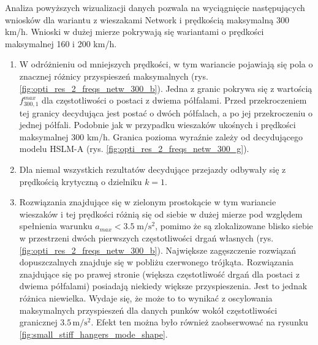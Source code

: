 Analiza powyższych wizualizacji danych pozwala na wyciągnięcie następujących wniosków dla wariantu z wieszakami Network i prędkością maksymalną 300 km/h. Wnioski w dużej mierze pokrywają się wariantami o prędkości maksymalnej 160 i 200 km/h.
\begin{enumerate}
	\item W odróżnieniu od mniejszych prędkości, w tym wariancie pojawiają się pola o znacznej różnicy przyspieszeń maksymalnych (rys. \ref{fig:opti_res_2_freqs_netw_300_b}). Jedna z granic pokrywa się z wartością $f_{300,1}^{max}$ dla częstotliwości o postaci z dwiema półfalami. Przed przekroczeniem tej granicy decydująca jest postać o dwóch półfalach, a po jej przekroczeniu o jednej półfali. Podobnie jak w przypadku wieszaków ukośnych i prędkości maksymalnej 300 km/h. Granica pozioma wyraźnie zależy od decydującego modelu HSLM-A (rys. \ref{fig:opti_res_2_freqs_netw_300_g}).
	\item Dla niemal wszystkich rezultatów decydujące przejazdy odbywały się z prędkością krytyczną o dzielniku $k=1$.
	\item Rozwiązania znajdujące się w zielonym prostokącie w tym wariancie wieszaków i tej prędkości różnią się od siebie w dużej mierze pod względem spełnienia warunku $a_{max}<3.5\;\mathrm{m/s^2}$, pomimo że są zlokalizowane blisko siebie w przestrzeni dwóch pierwszych częstotliwości drgań własnych (rys. \ref{fig:opti_res_2_freqs_netw_300_b}). Największe zagęszczenie rozwiązań dopuszczalnych znajduje się w pobliżu czerwonego trójkąta. Rozwiązania znajdujące się po prawej stronie (większa częstotliwość drgań dla postaci z dwiema półfalami) posiadają niekiedy większe przyspieszenia. Jest to jednak różnica niewielka. Wydaje się, że może to to wynikać z oscylowania maksymalnych przyspieszeń dla danych punków wokół częstotliwości granicznej $3.5\,\mathrm{m/s^2}$. Efekt ten można było również zaobserwować na rysunku \ref{fig:small_stiff_hangers_mode_shape}.
\end{enumerate}
\vfill



